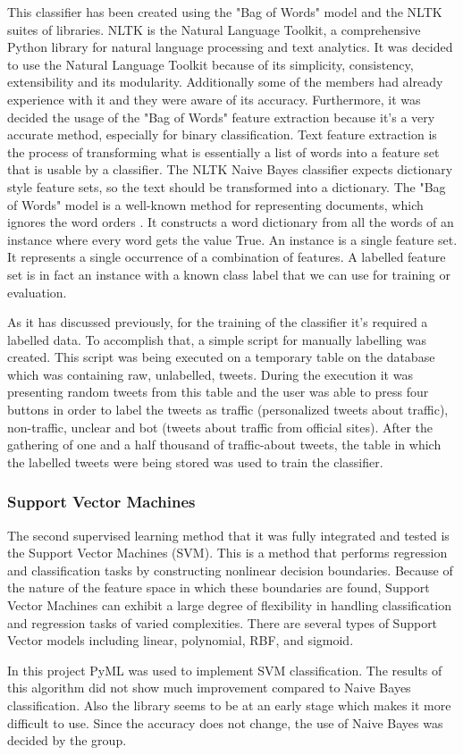 This classifier has been created using the "Bag of Words" model and the NLTK suites of libraries. NLTK is the Natural Language Toolkit, a comprehensive Python library for natural language processing and text analytics. It was decided to use the Natural Language Toolkit because of its simplicity, consistency, extensibility and its modularity. Additionally some of the members had already experience with it and they were aware of its accuracy. Furthermore, it was decided the usage of the "Bag of Words" feature extraction because it's a very accurate method, especially for binary classification. Text feature extraction is the process of transforming what is essentially a list of words into a feature set that is usable by a classifier. The NLTK Naive Bayes classifier expects dictionary style feature sets, so the text should be transformed into a dictionary. The "Bag of Words" model is a well-known method for representing documents, which ignores the word orders \cite{Bird}\cite{Perkins}. It constructs a word dictionary from all the words of an instance where every word gets the value True. An instance is a single feature set. It represents a single occurrence of a combination of features. A labelled feature set is in fact an instance with a known class label that we can use for training or evaluation.

As it has discussed previously, for the training of the classifier it's required a labelled data. To accomplish that, a simple script for manually labelling was created. This script was being executed on a temporary table on the database which was containing raw, unlabelled, tweets. During the execution it was presenting random tweets from this table and the user was able to press four buttons in order to label the tweets as traffic (personalized tweets about traffic), non-traffic, unclear and bot (tweets about traffic from official sites). After the gathering of one and a half thousand of traffic-about tweets, the table in which the labelled tweets were being stored was used to train the classifier.

\subsubsection{Support Vector Machines}
The second supervised learning method that it was fully integrated and tested is the Support Vector Machines (SVM). This is a method that performs regression and classification tasks by constructing nonlinear decision boundaries. Because of the nature of the feature space in which these boundaries are found, Support Vector Machines can exhibit a large degree of flexibility in handling classification and regression tasks of varied complexities. There are several types of Support Vector models including linear, polynomial, RBF, and sigmoid.

In this project PyML\cite{website:pyml} was used to implement SVM
classification. The results of this algorithm did not show much improvement
compared to Naive Bayes classification. Also the library seems to be at an
early stage which makes it more difficult to use. Since the accuracy does not
change, the use of Naive Bayes was decided by the group.

